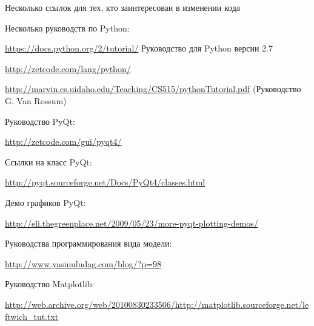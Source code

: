 Несколько ссылок для тех, кто заинтересован в изменении кода

Несколько руководств по Python:

\url{https://docs.python.org/2/tutorial/} Руководство для Python версии 2.7

\url{http://zetcode.com/lang/python/}

\url{http://marvin.cs.uidaho.edu/Teaching/CS515/pythonTutorial.pdf} (Руководство G. Van Rossum)

Руководство PyQt:

\url{http://zetcode.com/gui/pyqt4/}

Ссылки на класс PyQt:

\url{http://pyqt.sourceforge.net/Docs/PyQt4/classes.html}

Демо графиков PyQt:

\url{http://eli.thegreenplace.net/2009/05/23/more-pyqt-plotting-demos/}

Руководства программирования вида модели:

\url{http://www.yasinuludag.com/blog/?p=98}

Руководство Matplotlib:

\url{http://web.archive.org/web/20100830233506/http://matplotlib.sourceforge.net/leftwich_tut.txt}